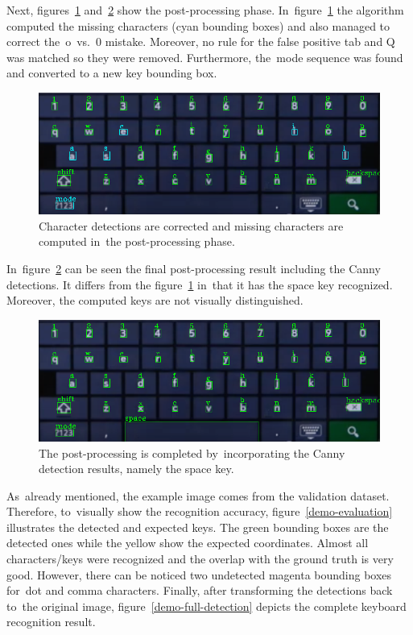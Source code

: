 Next, figures~\ref{demo-postprocessing} and~\ref{demo-full-postprocessing} show the post-processing phase. In~figure~\ref{demo-postprocessing} the algorithm computed the missing characters (cyan bounding boxes) and also managed to correct \hbox{the o vs. 0} mistake. Moreover, no rule for the false positive tab and Q was matched so they were removed. Furthermore, the~mode sequence was found and converted to a new key bounding box.

\begin{figure}[hbt]
    \includegraphics[width=1\textwidth]{img/design/demo-postprocessing.png}
    \caption{Character detections are corrected and missing characters are computed in~the post-processing phase.}
    \label{demo-postprocessing}
\end{figure}

In~figure~\ref{demo-full-postprocessing} can be seen the final post-processing result including the Canny detections. It differs from the figure~\ref{demo-postprocessing} in~that it has the space key recognized. Moreover, the computed keys are not visually distinguished.

\begin{figure}[!hbt]
    \includegraphics[width=1\textwidth]{img/design/demo-full-postprocessing.png}
    \caption{The post-processing is completed by~incorporating the Canny detection results, namely the space key.}
    \label{demo-full-postprocessing}
\end{figure}

As~already mentioned, the example image comes from the validation dataset. Therefore, to~visually show the recognition accuracy, figure~\ref{demo-evaluation} illustrates the detected and expected keys. The green bounding boxes are the detected ones while the yellow show the expected coordinates. Almost all characters/keys were recognized and the overlap with the ground truth is very good. However, there can be noticed two undetected magenta bounding boxes for~dot and comma characters. Finally, after transforming the detections back to~the original image, figure~\ref{demo-full-detection} depicts the complete keyboard recognition result.

